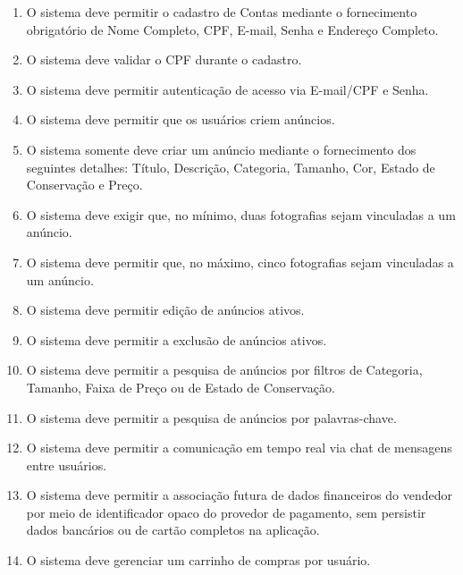 \documentclass[
	article,			%
	11pt,				%
	oneside,			%
	a4paper,			%
	english,			%
	brazil,				%
	sumario=tradicional
	]{abntex2}
\begin{document}
\begin{enumerate}[label=RF\arabic*:]

    \item O sistema deve permitir o cadastro de Contas mediante o fornecimento obrigatório de Nome Completo, CPF, E-mail, Senha e Endereço Completo.

    \item O sistema deve validar o CPF durante o cadastro.
    
    \item O sistema deve permitir autenticação de acesso via E-mail/CPF e Senha.

    \item O sistema deve permitir que os usuários criem anúncios.

    \item O sistema somente deve criar um anúncio mediante o fornecimento dos seguintes detalhes: Título, Descrição, Categoria, Tamanho, Cor, Estado de Conservação e Preço.

    \item O sistema deve exigir que, no mínimo, duas fotografias sejam vinculadas a um anúncio.

    \item O sistema deve permitir que, no máximo, cinco fotografias sejam vinculadas a um anúncio.

    \item O sistema deve permitir edição de anúncios ativos.

    \item O sistema deve permitir a exclusão de anúncios ativos. 

    \item O sistema deve permitir a pesquisa de anúncios por filtros de Categoria, Tamanho, Faixa de Preço ou de Estado de Conservação.

    \item O sistema deve permitir a pesquisa de anúncios por palavras-chave.

    \item O sistema deve permitir a comunicação em tempo real via chat de mensagens entre usuários.

    \item O sistema deve permitir a associação futura de dados financeiros do vendedor por meio de identificador opaco do provedor de pagamento, sem persistir dados bancários ou de cartão completos na aplicação.

    \item O sistema deve gerenciar um carrinho de compras por usuário.


\end{enumerate}
\end{document}
